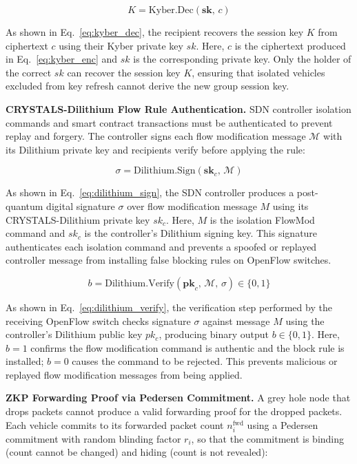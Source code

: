 \documentclass[12pt, a4paper]{report}
\begin{document}
\begin{equation}
\label{eq:kyber_dec}
K = \mathrm{Kyber.Dec}(\mathbf{sk},\, c)
\end{equation}

As shown in Eq.~\eqref{eq:kyber_dec}, the recipient recovers the session key $K$ from ciphertext $c$ using their Kyber private key $sk$. Here, $c$ is the ciphertext produced in Eq.~\eqref{eq:kyber_enc} and $sk$ is the corresponding private key. Only the holder of the correct $sk$ can recover the session key $K$, ensuring that isolated vehicles excluded from key refresh cannot derive the new group session key.

\textbf{CRYSTALS-Dilithium Flow Rule Authentication.}
SDN controller isolation commands and smart contract transactions must be
authenticated to prevent replay and forgery. The controller signs each
flow modification message $\mathcal{M}$ with its Dilithium private key
and recipients verify before applying the rule:

\begin{equation}
\label{eq:dilithium_sign}
\sigma = \mathrm{Dilithium.Sign}(\mathbf{sk}_c,\, \mathcal{M})
\end{equation}

As shown in Eq.~\eqref{eq:dilithium_sign}, the SDN controller produces a post-quantum digital signature $\sigma$ over flow modification message $M$ using its CRYSTALS-Dilithium private key $sk_c$. Here, $M$ is the isolation FlowMod command and $sk_c$ is the controller's Dilithium signing key. This signature authenticates each isolation command and prevents a spoofed or replayed controller message from installing false blocking rules on OpenFlow switches.

\begin{equation}
\label{eq:dilithium_verify}
b = \mathrm{Dilithium.Verify}(\mathbf{pk}_c,\, \mathcal{M},\, \sigma)
\in \{0,1\}
\end{equation}

As shown in Eq.~\eqref{eq:dilithium_verify}, the verification step performed by the receiving OpenFlow switch checks signature $\sigma$ against message $M$ using the controller's Dilithium public key $pk_c$, producing binary output $b \in \{0, 1\}$. Here, $b = 1$ confirms the flow modification command is authentic and the block rule is installed; $b = 0$ causes the command to be rejected. This prevents malicious or replayed flow modification messages from being applied.

\textbf{ZKP Forwarding Proof via Pedersen Commitment.}
A grey hole node that drops packets cannot produce a valid forwarding proof for
the dropped packets. Each vehicle commits to its forwarded packet count
$n_i^{\text{fwd}}$ using a Pedersen commitment with random blinding factor
$r_i$, so that the commitment is binding (count cannot be changed) and
hiding (count is not revealed):
\end{document}
